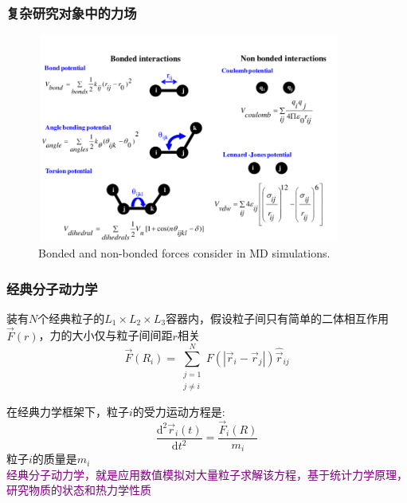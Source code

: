 \frame
{
	\frametitle{复杂研究对象中的力场}
\begin{figure}[h!]
\centering
\vspace*{-0.10in}
\includegraphics[height=2.70in,width=3.95in,viewport=0 0 830 550,clip]{Figures/Bonded-and-non-bonded-interactions-used-to-describe-interactions-between-atoms.png}
\caption{\tiny \textrm{Bonded and non-bonded forces consider in MD simulations.}}%
\label{Bond-non-Bonded}
\end{figure}
}

\frame
{
	\frametitle{经典分子动力学}
	装有$N$个经典粒子的$L_1\times L_2\times L_3$容器内，假设粒子间只有简单的二体相互作用%
	$\vec F(r)$，力的大小仅与粒子间间距$r$相关
	\begin{displaymath}
		\vec F(R_i)=\sum_{\substack{j=1\\j\neq i}}^N F(|\vec r_i-\vec r_j|)\hat{\vec r}_{ij}
	\end{displaymath}
	{\fontsize{7.2pt}{6.2pt}}

	在经典力学框架下，粒子$i$的受力运动方程是:~
	\begin{displaymath}
		\dfrac{\mathrm{d}^2\vec r_i(t)}{\mathrm{d}t^2}=\dfrac{\vec F_i(R)}{m_i}
	\end{displaymath}
	粒子$i$的质量是$m_i$\\
	\textcolor{purple}{经典分子动力学，就是应用数值模拟对大量粒子求解该方程，基于统计力学原理，研究物质的状态和热力学性质}
}

